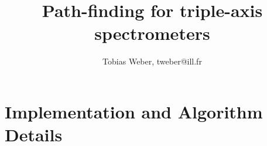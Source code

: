 \documentclass[english, 11pt]{book}
\begin{document}
\newcommand{\ill}{Institut Laue-Langevin (ILL), 71 avenue des Martyrs, CS 20156, 38042 Grenoble cedex 9, France}
\newcommand{\fuh}{Fernuniversit\"at in Hagen (FUH), Universit\"atsstraße 47, 58097 Hagen, Germany}


\title{Path-finding for triple-axis spectrometers}
\author{Tobias Weber, tweber@ill.fr}

\maketitle
\tableofcontents












\chapter{Implementation and Algorithm Details}


\appendix








\end{document}
